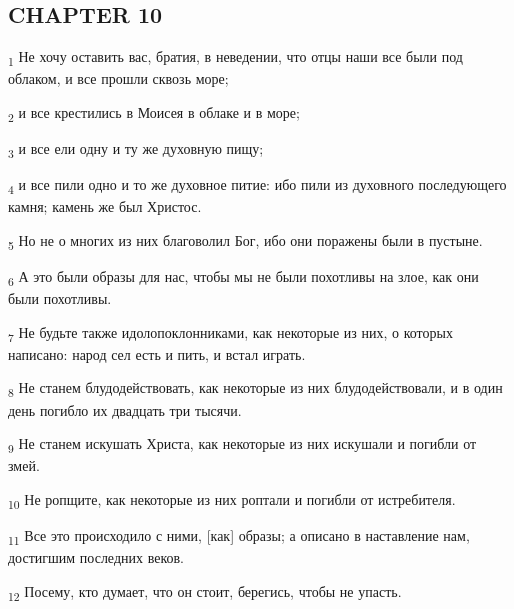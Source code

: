 \subsection{CHAPTER 10}
\begin{tcolorbox}
\textsubscript{1} Не хочу оставить вас, братия, в неведении, что отцы наши все были под облаком, и все прошли сквозь море;
\end{tcolorbox}
\begin{tcolorbox}
\textsubscript{2} и все крестились в Моисея в облаке и в море;
\end{tcolorbox}
\begin{tcolorbox}
\textsubscript{3} и все ели одну и ту же духовную пищу;
\end{tcolorbox}
\begin{tcolorbox}
\textsubscript{4} и все пили одно и то же духовное питие: ибо пили из духовного последующего камня; камень же был Христос.
\end{tcolorbox}
\begin{tcolorbox}
\textsubscript{5} Но не о многих из них благоволил Бог, ибо они поражены были в пустыне.
\end{tcolorbox}
\begin{tcolorbox}
\textsubscript{6} А это были образы для нас, чтобы мы не были похотливы на злое, как они были похотливы.
\end{tcolorbox}
\begin{tcolorbox}
\textsubscript{7} Не будьте также идолопоклонниками, как некоторые из них, о которых написано: народ сел есть и пить, и встал играть.
\end{tcolorbox}
\begin{tcolorbox}
\textsubscript{8} Не станем блудодействовать, как некоторые из них блудодействовали, и в один день погибло их двадцать три тысячи.
\end{tcolorbox}
\begin{tcolorbox}
\textsubscript{9} Не станем искушать Христа, как некоторые из них искушали и погибли от змей.
\end{tcolorbox}
\begin{tcolorbox}
\textsubscript{10} Не ропщите, как некоторые из них роптали и погибли от истребителя.
\end{tcolorbox}
\begin{tcolorbox}
\textsubscript{11} Все это происходило с ними, [как] образы; а описано в наставление нам, достигшим последних веков.
\end{tcolorbox}
\begin{tcolorbox}
\textsubscript{12} Посему, кто думает, что он стоит, берегись, чтобы не упасть.
\end{tcolorbox}
